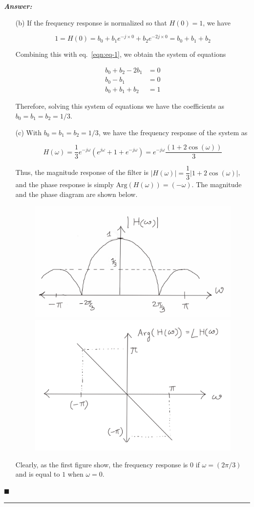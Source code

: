 \documentclass[12pt]{article}
\theoremstyle{definition}
\newenvironment{answer}{
    \textbf{\textit{Answer:}} \qquad
}{\hfill $\blacksquare$ \\ \begin{center}
    \rule{0.6\linewidth}{0.5px}    
\end{center}
}
\begin{document}
\begin{answer}
\begin{enumerate}
        \item[(b)]  If the frequency response is normalized so that $H(0) = 1$, we have 
        
        $$
        1 = H(0) = b_0 + b_1 e^{-j\times 0} + b_2 e^{-2j \times 0} = b_0 + b_1 + b_2
        $$

        Combining this with eq.~\eqref{eqn:eq-1}, we obtain the system of equations 

        \begin{align*}
            b_0 + b_2 - 2b_1 & = 0\\
            b_0 - b_1 & = 0\\
            b_0 + b_1 + b_2 & = 1
        \end{align*}

        Therefore, solving this system of equations we have the coefficients as $b_0 = b_1 = b_2 = 1/3$.

        \item[(c)] With $b_0 = b_1 = b_2 = 1/3$, we have the frequency response of the system as 
        
        $$
        H(\omega) = \dfrac{1}{3} e^{-j\omega} (e^{j\omega} + 1 + e^{-j\omega}) = e^{-j\omega} \dfrac{(1 + 2\cos(\omega))}{3}
        $$

        Thus, the magnitude response of the filter is $\vert H(\omega) \vert = \dfrac{1}{3}\vert 1 + 2\cos(\omega) \vert$, and the phase response is simply $\text{Arg}(H(\omega)) = (-\omega)$. The magnitude and the phase diagram are shown below.

        \begin{figure}[H]
            \centering
            \includegraphics[width = 0.6\linewidth]{img1.png}
            \includegraphics[width = 0.6\linewidth]{img2.png}
        \end{figure}

        Clearly, as the first figure show, the frequency response is $0$ if $\omega = (2\pi/3)$ and is equal to $1$ when $\omega = 0$.
    \end{enumerate}

\end{answer}
\end{document}
